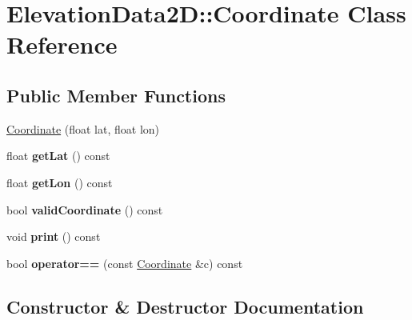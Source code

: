 \hypertarget{classElevationData2D_1_1Coordinate}{}\section{Elevation\+Data2D\+:\+:Coordinate Class Reference}
\label{classElevationData2D_1_1Coordinate}
\subsection*{Public Member Functions}
\begin{DoxyCompactItemize}
\item 
\mbox{\hyperlink{classElevationData2D_1_1Coordinate_a3ff774cb0ce7ea81e30ec3659926f0e6}{Coordinate}} (float lat, float lon)
\item 
\mbox{\label{classElevationData2D_1_1Coordinate_a9cb2d0d999478776f5fb7456d024b97c}} 
float {\bfseries get\+Lat} () const
\item 
\mbox{\label{classElevationData2D_1_1Coordinate_adae2431d945693d0c4fd0ed5058b5059}} 
float {\bfseries get\+Lon} () const
\item 
\mbox{\label{classElevationData2D_1_1Coordinate_a12d54132cb2932ee9a4fbd0b824a61ed}} 
bool {\bfseries valid\+Coordinate} () const
\item 
\mbox{\label{classElevationData2D_1_1Coordinate_a6e19aa7d4af4d8ca5fc9f89b2cc20ebe}} 
void {\bfseries print} () const
\item 
\mbox{\label{classElevationData2D_1_1Coordinate_a00b806defca072838b458e22a2ec2f96}} 
bool {\bfseries operator==} (const \mbox{\hyperlink{classElevationData2D_1_1Coordinate}{Coordinate}} \&c) const
\end{DoxyCompactItemize}


\subsection{Constructor \& Destructor Documentation}
\mbox{\label{classElevationData2D_1_1Coordinate_a3ff774cb0ce7ea81e30ec3659926f0e6}} 
